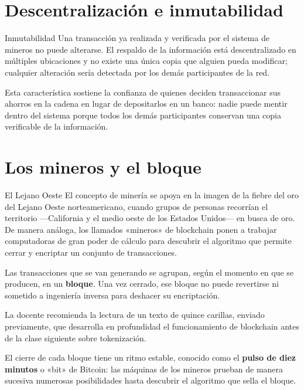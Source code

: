 \documentclass[12pt,oneside]{book}
\begin{document}
\section{Descentralización e inmutabilidad}

\begin{definition}{Inmutabilidad}
Una transacción ya realizada y verificada por el sistema de mineros no puede alterarse. El respaldo de la información está descentralizado en múltiples ubicaciones y no existe una única copia que alguien pueda modificar; cualquier alteración sería detectada por los demás participantes de la red.
\end{definition}

Esta característica sostiene la confianza de quienes deciden transaccionar sus ahorros en la cadena en lugar de depositarlos en un banco: nadie puede mentir dentro del sistema porque todos los demás participantes conservan una copia verificable de la información.

\section{Los mineros y el bloque}

\begin{example}{El Lejano Oeste}
El concepto de minería se apoya en la imagen de la fiebre del oro del Lejano Oeste norteamericano, cuando grupos de personas recorrían el territorio —California y el medio oeste de los Estados Unidos— en busca de oro. De manera análoga, los llamados «mineros» de blockchain ponen a trabajar computadoras de gran poder de cálculo para descubrir el algoritmo que permite cerrar y encriptar un conjunto de transacciones.
\end{example}

Las transacciones que se van generando se agrupan, según el momento en que se producen, en un \textbf{bloque}. Una vez cerrado, ese bloque no puede revertirse ni sometido a ingeniería inversa para deshacer su encriptación.

\begin{note}
La docente recomienda la lectura de un texto de quince carillas, enviado previamente, que desarrolla en profundidad el funcionamiento de blockchain antes de la clase siguiente sobre tokenización.
\end{note}

El cierre de cada bloque tiene un ritmo estable, conocido como el \textbf{pulso de diez minutos} o «bit» de Bitcoin: las máquinas de los mineros prueban de manera sucesiva numerosas posibilidades hasta descubrir el algoritmo que sella el bloque.
\end{document}
